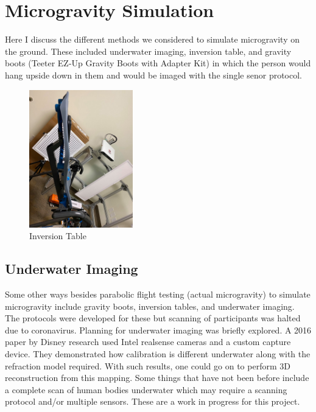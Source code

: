 \section{Microgravity Simulation}
Here I discuss the different methods we considered to simulate microgravity on the ground. These included underwater imaging, inversion table, and gravity boots (Teeter EZ-Up Gravity Boots with Adapter Kit) in which the person would hang upside down in them and would be imaged with the single senor protocol.

\begin{figure}[!htb]
	\caption{Inversion Table}
	\centering
	\includegraphics[width=0.4\textwidth]{images/inversion.jpg}
\end{figure}
\subsection{Underwater Imaging}
Some other ways besides parabolic flight testing (actual microgravity) to simulate microgravity include gravity boots, inversion tables, and underwater imaging. The protocols were developed for these but scanning of participants was halted due to coronavirus. Planning for underwater imaging was briefly explored. A 2016 paper by Disney research \cite{digumarti2016underwater} used Intel realsense cameras and a custom capture device. They demonstrated how calibration is different underwater along with the refraction model required. With such results, one could go on to perform 3D reconstruction from this mapping. Some things that have not been before include a complete scan of human bodies underwater which may require a scanning protocol and/or multiple sensors. These are a work in progress for this project.
